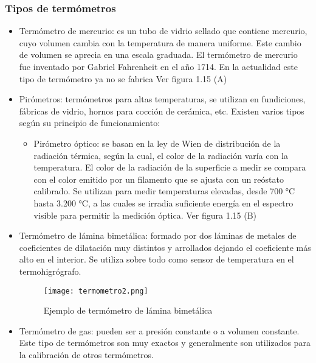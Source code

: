 \subsubsection{Tipos de termómetros}

\begin{itemize}
	\item Termómetro de mercurio: es un tubo de vidrio sellado que contiene mercurio, cuyo volumen cambia con la temperatura de manera uniforme. Este cambio de volumen se aprecia en una escala graduada. El termómetro de mercurio fue inventado por Gabriel Fahrenheit en el año 1714. En la actualidad este tipo de termómetro ya no se fabrica\cite{termometro} Ver figura 1.15 (A)
	
	\item Pirómetros:  termómetros para altas temperaturas, se utilizan en fundiciones, fábricas de vidrio, hornos para cocción de cerámica, etc.\cite{termometro} Existen varios tipos según su principio de funcionamiento:
	
	\begin{itemize}
		
		\item Pirómetro óptico: se basan en la ley de Wien de distribución de la radiación térmica, según la cual, el color de la radiación varía con la temperatura. El color de la radiación de la superficie a medir se compara con el color emitido por un filamento que se ajusta con un reóstato calibrado. Se utilizan para medir temperaturas elevadas, desde 700 °C hasta 3.200 °C, a las cuales se irradia suficiente energía en el espectro visible para permitir la medición óptica. Ver figura 1.15 (B)
		
	\end{itemize}
	
	\item Termómetro de lámina bimetálica: formado por dos láminas de metales de coeficientes de dilatación muy distintos y arrollados dejando el coeficiente más alto en el interior. Se utiliza sobre todo como sensor de temperatura en el termohigrógrafo.
	
	\begin{figure}[H]
		\centering
		\texttt{[image: termometro2.png]}
		\caption{Ejemplo de termómetro de lámina bimetálica}
	\end{figure}
	
	\item Termómetro de gas: pueden ser a presión constante o a volumen constante. Este tipo de termómetros son muy exactos y generalmente son utilizados para la calibración de otros termómetros.
	

\end{itemize}
